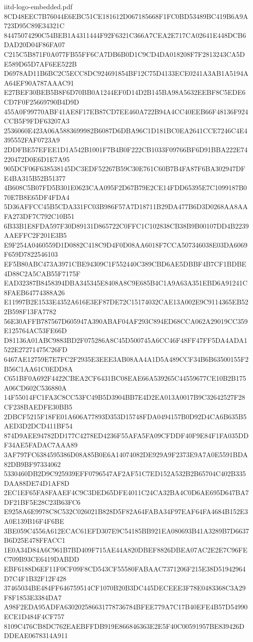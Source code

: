 \begin{filecontents*}[overwrite]{iitd-logo-embedded.pdf}
8CD48EEC7B76044E6EBC51CE181612D067185668F1FC0BD53489BC419B6A9A723D95C89E34321C
84475074290C54BEB1A4311444F92F6321C366A7CEA2E717CA02641E448DCB6DAD20D04F86FA07
C215C5B871F0A077FB55FF6CA7DB6B0D1C9CD4DA018208F7F2813243CA5DE589D65D7AF6EE522B
D6978AD11B6BC2C5ECC8DC924691854BF12C75D4133ECE0241A3AB1A5194AA64EF90A787AAAC91
E27BEF30BEB5B8F6D70BB0A1244EF0D14D2B145BA98A5632EEBF8C5EDE6CD7F0F25669790B4D9D
455A0F99770ABF41AE8F17EB87CD7EE460A722B94A4CC40EEB66F48136F924CCB5F9FDF63207A3
2536060E423A06A5883699982B6087D6DBA96C1D181BC0EA2641CCE7246C4E4395552FAF0723A9
2DDFBE57EFEE1D1A542B1001F7B4B0F222CB1033F09766BF6D91BBA222E74220472D0E6D1E7A95
905DCF06F638538145DC3EDF52267B59C30E761C60B7B4FA87F6BA302947DFE4BA315B52B51377
4B608C5B07FD5B301E0623CAA095F2D67B79E2CE14FDD65395E7C1099187B070E7B8E65DF4FDA4
5D36AFFCC45B5CDA331FC03B986F57A7D18711B29DA477B6D3D0268AA8AAFA273DF7C792C10B51
6B33B1E8FDA597F30D89131D865722C0FFC1C102838CB38B9B00107DD4B2239AAEFFC2F201E3B5
E9F254A0460559D1D0882C418C9D4F0D08AA6018F7CCA507346038E03DA6069F659D7822546103
EF5B80ABC473A3971CBE94309C1F552440C389CBD6AE5DBBF4B7CF1BDBE4D88C2A5CAB55F7175F
EAD32387B8458394DBA345345E8408A8C9E685B4C1A9A63A351EBD6A91241C8FAEB64774388A26
E11997B2E1533E4352A616E3EF87DE72C15174032CAE13A002E9C9114365EB522B598F13FA7782
56E30AFFB787567D605947A390ABAF04AF293C894ED68CCA062A29019CC359E125764AC53FE66D
D81136A01ABC9883BD2F075286A8C45D500745A6CC46F48FF47FF5DA4ADA1522E27271475C26FD
6467AE12759E7E7FC2F2935E3EEE3AB08AA4A1D5A489CCF34B6B63500155F2B56C1AA61C0EDD8A
C651BF0A692F4422CBEA2CF6431BC08EAE66A539265C44559677CE10B2B175A06CD602C536880A
14F55014FC1FA3C8CC53FC49B5D3904BB7E4D2EA013A0017B9C32642527F28CF238BAEDFE30BB5
2DBCF5215F18FE01A606A77893D353D15748FDA0494157B0D92D4CA6B635B5AED3D2DCD411BF54
874D9AEE94782DD177C4278ED4236F55AFA5FA09CFDDF40F9E84F1FA035DDF34AE5FADAC7AAA89
3AF797FC6384595386D08A85B0E6A14074082DE929A9F2373E9A7A0E5591BDA82DB9BF97334062
5330460DB2D9C925939EFF0796547AF2AF51C7ED152A532B2B65704C402B335DAA88DE74D1AF8D
2EC1EF65FA8FAAEF4C9C3DED65DFE4011C24CA32BA4C0D6AE695D647BA7DF21BF5E28C23B63FC6
E9258A6E9978C8C532C026021B828D5F82A64FABA34F97EAF64FA4684B152E3A0E139B16F4F6BE
3BE059C4556A612ECAC61EFD307E9C54185BB921EA080693B41A3289B7D6637B6D25E478FFACC1
1E0A34D84A6C961B7BD409F715AE44A820DBEF8826DBEA07AC2E2E7C96FEC709B93CE6419DABDD
EBF6188D6EF11F0CF09F8CD543CF55580FABAAC7371206F215E38D51942964D7C4F1B32F12F428
37465034BE484FF646759514CF1070B20B3DC445DECEEE3F78E0483368C3A29F8F1853E3384DA7
A98F2EDA95ADFA630202586631778736784BFEE779A7C17B40EFE4B57D54990ECE1D484F4CF757
8109C476CB8DC762EAEBFFDB919E866846363E2E5F40C00591957BE839426DDDEAE0678314A911

\end{filecontents*}

